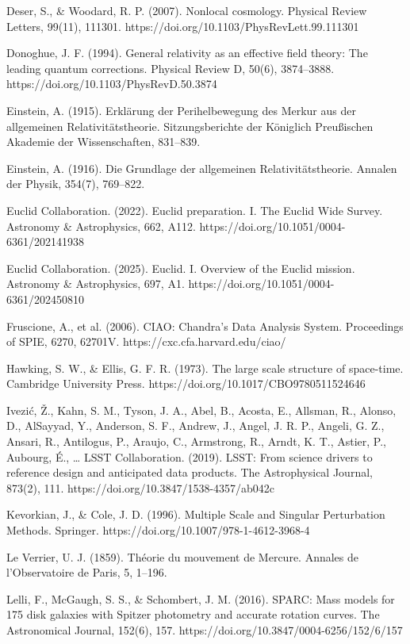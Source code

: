 \documentclass[11pt]{article}
\begin{document}
Deser, S., \& Woodard, R. P. (2007). Nonlocal cosmology. Physical Review Letters, 99(11), 111301. https://doi.org/10.1103/PhysRevLett.99.111301

Donoghue, J. F. (1994). General relativity as an effective field theory: The leading quantum corrections. Physical Review D, 50(6), 3874--3888. https://doi.org/10.1103/PhysRevD.50.3874

Einstein, A. (1915). Erklärung der Perihelbewegung des Merkur aus der allgemeinen Relativitätstheorie. Sitzungsberichte der Königlich Preußischen Akademie der Wissenschaften, 831--839.

Einstein, A. (1916). Die Grundlage der allgemeinen Relativitätstheorie. Annalen der Physik, 354(7), 769--822.

Euclid Collaboration. (2022). Euclid preparation. I. The Euclid Wide Survey. Astronomy \& Astrophysics, 662, A112. https://doi.org/10.1051/0004-6361/202141938

Euclid Collaboration. (2025). Euclid. I. Overview of the Euclid mission. Astronomy \& Astrophysics, 697, A1. https://doi.org/10.1051/0004-6361/202450810

Fruscione, A., et al. (2006). CIAO: Chandra's Data Analysis System. Proceedings of SPIE, 6270, 62701V. https://cxc.cfa.harvard.edu/ciao/

Hawking, S. W., \& Ellis, G. F. R. (1973). The large scale structure of space-time. Cambridge University Press. https://doi.org/10.1017/CBO9780511524646

Ivezić, Ž., Kahn, S. M., Tyson, J. A., Abel, B., Acosta, E., Allsman, R., Alonso, D., AlSayyad, Y., Anderson, S. F., Andrew, J., Angel, J. R. P., Angeli, G. Z., Ansari, R., Antilogus, P., Araujo, C., Armstrong, R., Arndt, K. T., Astier, P., Aubourg, É., \ldots{} LSST Collaboration. (2019). LSST: From science drivers to reference design and anticipated data products. The Astrophysical Journal, 873(2), 111. https://doi.org/10.3847/1538-4357/ab042c

Kevorkian, J., \& Cole, J. D. (1996). Multiple Scale and Singular Perturbation Methods. Springer. https://doi.org/10.1007/978-1-4612-3968-4

Le Verrier, U. J. (1859). Théorie du mouvement de Mercure. Annales de l'Observatoire de Paris, 5, 1--196.

Lelli, F., McGaugh, S. S., \& Schombert, J. M. (2016). SPARC: Mass models for 175 disk galaxies with Spitzer photometry and accurate rotation curves. The Astronomical Journal, 152(6), 157. https://doi.org/10.3847/0004-6256/152/6/157
\end{document}
